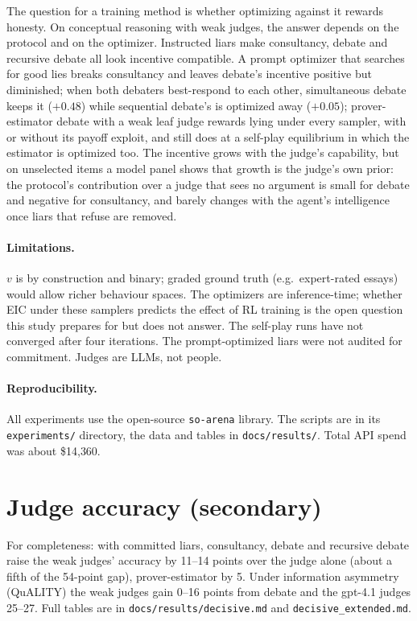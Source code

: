 \documentclass[11pt]{article}
\begin{document}
The question for a training method is whether optimizing against it rewards honesty. On conceptual reasoning with
weak judges, the answer depends on the protocol and on the optimizer. Instructed liars make consultancy, debate and
recursive debate all look incentive compatible. A prompt optimizer that searches for good lies breaks consultancy and
leaves debate's incentive positive but diminished; when both debaters best-respond to each other, simultaneous
debate keeps it ($+0.48$) while sequential debate's is optimized away ($+0.05$); prover-estimator debate with a weak leaf judge rewards lying
under every sampler, with or without its payoff exploit, and still does at a self-play equilibrium in which the estimator is optimized too. The incentive grows with the judge's capability, but on unselected items a model panel shows that growth is the judge's own prior: the protocol's contribution over a judge that sees no argument is small for debate and negative for consultancy, and barely changes with the agent's intelligence once liars that refuse are removed.

\paragraph{Limitations.} $v$ is by construction and binary; graded ground truth (e.g.\ expert-rated essays) would
allow richer behaviour spaces. The optimizers are inference-time; whether EIC under these samplers predicts the effect
of RL training is the open question this study prepares for but does not answer. The self-play runs have not converged
after four iterations. The prompt-optimized liars were not audited for
commitment. Judges are LLMs, not people.

\paragraph{Reproducibility.} All experiments use the open-source \texttt{so-arena} library. The scripts are in its
\nolinkurl{experiments/} directory, the data and tables in \nolinkurl{docs/results/}. Total API spend was
about \$14{,}360.




\appendix
\section{Judge accuracy (secondary)}
For completeness: with committed liars, consultancy, debate and recursive debate raise the weak judges' accuracy by
11--14 points over the judge alone (about a fifth of the 54-point gap), prover-estimator by 5. Under information
asymmetry (QuALITY) the weak judges gain 0--16 points from debate and the gpt-4.1 judges 25--27. Full tables are in
\nolinkurl{docs/results/decisive.md} and \nolinkurl{decisive_extended.md}.
\end{document}
